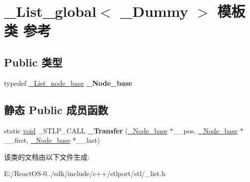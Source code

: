 \hypertarget{class___list__global}{}\section{\+\_\+\+List\+\_\+global$<$ \+\_\+\+Dummy $>$ 模板类 参考}
\label{class___list__global}
\subsection*{Public 类型}
\begin{DoxyCompactItemize}
\item 
\mbox{\label{class___list__global_a1ec2e15f6e1e02ecc928107212a6e10f}} 
typedef \hyperlink{struct___list__node__base}{\+\_\+\+List\+\_\+node\+\_\+base} {\bfseries \+\_\+\+Node\+\_\+base}
\end{DoxyCompactItemize}
\subsection*{静态 Public 成员函数}
\begin{DoxyCompactItemize}
\item 
\mbox{\label{class___list__global_a35594b612370071d865dffbc6e95d55a}} 
static \hyperlink{interfacevoid}{void} \+\_\+\+S\+T\+L\+P\+\_\+\+C\+A\+LL {\bfseries \+\_\+\+Transfer} (\hyperlink{struct___list__node__base}{\+\_\+\+Node\+\_\+base} $\ast$\+\_\+\+\_\+pos, \hyperlink{struct___list__node__base}{\+\_\+\+Node\+\_\+base} $\ast$\+\_\+\+\_\+first, \hyperlink{struct___list__node__base}{\+\_\+\+Node\+\_\+base} $\ast$\+\_\+\+\_\+last)
\end{DoxyCompactItemize}


该类的文档由以下文件生成\+:\begin{DoxyCompactItemize}
\item 
E\+:/\+React\+O\+S-\/0../sdk/include/c++/stlport/stl/\+\_\+list.\+h\end{DoxyCompactItemize}
